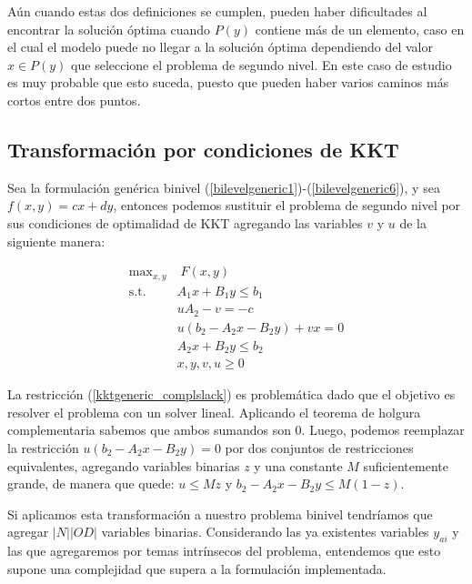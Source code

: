 \documentclass{article}
\begin{document}
  Aún cuando estas dos definiciones se cumplen, pueden haber dificultades al encontrar la solución óptima cuando $P(y)$ contiene más de un elemento, caso en el cual el modelo puede no llegar a la solución óptima dependiendo del valor $x \in P(y)$ que seleccione el problema de segundo nivel. En este caso de estudio es muy probable que esto suceda, puesto que pueden haber varios caminos más cortos entre dos puntos.

  \subsection{Transformación por condiciones de KKT}
  \label{sec:kkttransform}

  Sea la formulación genérica binivel (\ref{bilevelgeneric1})-(\ref{bilevelgeneric6}), y sea $f(x, y) = cx + dy$, entonces podemos sustituir el problema de segundo nivel por sus condiciones de optimalidad de KKT agregando las variables $v$ y $u$ de la siguiente manera:

  \begin{align}
    \text{max}_{x,y}        & \; F(x, y) \label{kktgeneric1} \\
    \text{s.t.}             & A_1 x + B_1 y \leq b_1 \\
                            & uA_2 - v = -c \\
                            & u(b_2 - A_2x - B_2y) + vx = 0 \label{kktgeneric_complslack} \\
                            & A_2 x + B_2 y \leq b_2 \label{kktgeneric5} \\
                            & x, y, v, u \geq 0 \label{kktgeneric6}
  \end{align}

  La restricción (\ref{kktgeneric_complslack}) es problemática dado que el objetivo es resolver el problema con un solver lineal. Aplicando el teorema de holgura complementaria sabemos que ambos sumandos son 0. Luego, podemos reemplazar la restricción $u(b_2 - A_2x - B_2y) = 0$ por dos conjuntos de restricciones equivalentes, agregando variables binarias $z$ y una constante $M$ suficientemente grande, de manera que quede: $u \leq Mz$ y $b_2 - A_2x - B_2y \leq M(1-z)$.

  Si aplicamos esta transformación a nuestro problema binivel tendríamos que agregar $|N| |OD|$ variables binarias. Considerando las ya existentes variables $y_{ai}$ y las que agregaremos por temas intrínsecos del problema, entendemos que esto supone una complejidad que supera a la formulación implementada.
\end{document}
